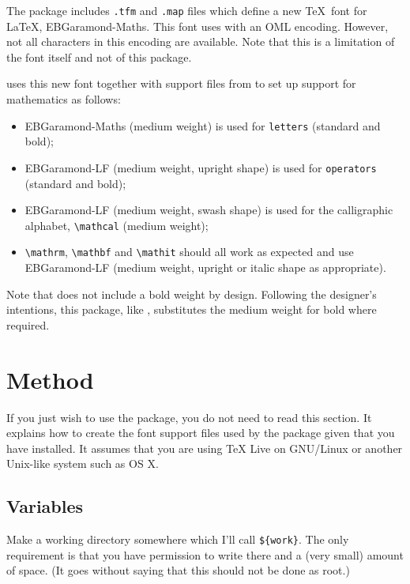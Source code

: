 \documentclass[12pt,british,a4paper]{article}
\begin{document}
The package includes \verb|.tfm| and \verb|.map| files which define a new \TeX\ font for \LaTeX, EBGaramond-Maths.
This font uses  with an OML encoding.
However, not all characters in this encoding are available.
Note that this is a limitation of the font itself and not of this package.

 uses this new font together with support files from  to set up support for mathematics as follows:
\begin{itemize}
  \item EBGaramond-Maths (medium weight) is used for \verb|letters| (standard and bold);
  \item EBGaramond-LF (medium weight, upright shape) is used for \verb|operators| (standard and bold);
  \item EBGaramond-LF (medium weight, swash shape) is used for the calligraphic alphabet, \verb|\mathcal| (medium weight);
  \item \verb|\mathrm|, \verb|\mathbf| and \verb|\mathit| should all work as expected and use EBGaramond-LF (medium weight, upright or italic shape as appropriate).
\end{itemize}

Note that  does not include a bold weight by design.
Following the designer's intentions, this package, like , substitutes the medium weight for bold where required.

\section{Method}\label{sec:dull}

If you just wish to use the package, you do not need to read this section.
It explains how to create the font support files used by the package given that you have  installed.
It assumes that you are using TeX Live on GNU/Linux or another Unix-like system such as OS X.

\subsection{Variables}\label{subsec:var}
Make a working directory somewhere which I'll call \verb|${work}|.
The only requirement is that you have permission to write there and a (very small) amount of space.
(It goes without saying that this should not be done as root.)
\end{document}
